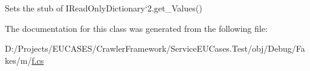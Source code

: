 Sets the stub of I\-Read\-Only\-Dictionary`2.get\-\_\-\-Values()



The documentation for this class was generated from the following file\-:\begin{DoxyCompactItemize}
\item 
D\-:/\-Projects/\-E\-U\-C\-A\-S\-E\-S/\-Crawler\-Framework/\-Service\-E\-U\-Cases.\-Test/obj/\-Debug/\-Fakes/m/\hyperlink{m_2f_8cs}{f.\-cs}\end{DoxyCompactItemize}
